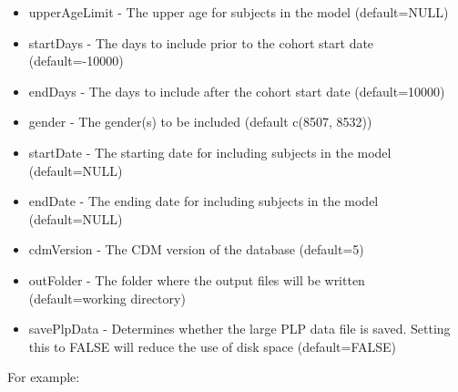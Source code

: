 \documentclass[
]{article}
\begin{document}
\begin{itemize}
\item
  upperAgeLimit - The upper age for subjects in the model (default=NULL)
\item
  startDays - The days to include prior to the cohort start date
  (default=-10000)
\item
  endDays - The days to include after the cohort start date
  (default=10000)
\item
  gender - The gender(s) to be included (default c(8507, 8532))
\item
  startDate - The starting date for including subjects in the model
  (default=NULL)
\item
  endDate - The ending date for including subjects in the model
  (default=NULL)
\item
  cdmVersion - The CDM version of the database (default=5)
\item
  outFolder - The folder where the output files will be written
  (default=working directory)
\item
  savePlpData - Determines whether the large PLP data file is saved.
  Setting this to FALSE will reduce the use of disk space
  (default=FALSE)
\end{itemize}

For example:
\end{document}
